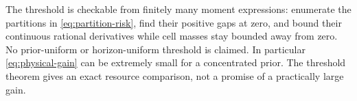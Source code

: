 The threshold is checkable from finitely many moment expressions: enumerate
the partitions in \eqref{eq:partition-risk}, find their positive gaps at
zero, and bound their continuous rational derivatives while cell masses
stay bounded away from zero. No prior-uniform or horizon-uniform threshold
is claimed. In particular \eqref{eq:physical-gain} can be extremely small
for a concentrated prior. The threshold theorem gives an exact resource
comparison, not a promise of a practically large gain.

